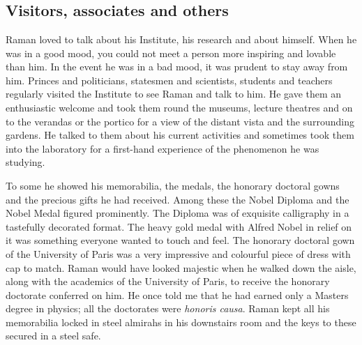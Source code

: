 \chapter{}\label{chap3}

\section*{Visitors, associates and others}


Raman loved to talk about his Institute, his research and
about himself. When he was in a good mood, you could not meet
a person more inspiring and lovable than him. In the event he
was in a bad mood, it was prudent to stay away from him. Princes
and politicians, statesmen and scientists, students and teachers
regularly visited the Institute to see Raman and talk to him.
He gave them an enthusiastic welcome and took them round the
museums, lecture theatres and on to the verandas or the portico
for a view of the distant vista and the surrounding gardens.
He talked to them about his current activities and sometimes took
them into the laboratory for a first-hand experience of the
phenomenon he was studying.

To  some he showed his memorabilia, the medals, the
honorary doctoral gowns and the precious gifts he had received.
Among these the Nobel Diploma and the Nobel Medal figured
prominently. The Diploma was of exquisite calligraphy in a
tastefully decorated format. The heavy gold medal with Alfred
Nobel in relief on it was something everyone wanted to touch
and feel. The honorary doctoral gown of the University of Paris
was a very impressive and colourful piece of dress with cap to
match. Raman would have looked majestic when he walked down
the aisle, along with the academics of the University of Paris,
to receive the honorary doctorate conferred on him. He once told
me that he had earned only a Masters degree in physics; all the
doctorates were {\em honoris causa}. Raman kept all his memorabilia
locked in steel almirahs in his downstairs room and the keys to
these secured in a steel safe.

